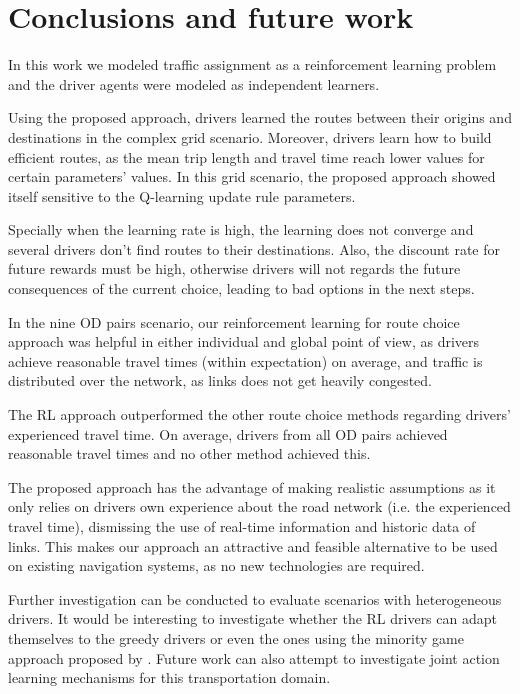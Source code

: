 \documentclass{RITA}
\begin{document}
\section{Conclusions and future work}
\label{sec:conclusions}

In this work we modeled traffic assignment as a reinforcement learning problem and the driver agents were modeled as independent learners.

Using the proposed approach, drivers learned the routes between their origins and destinations in the complex grid scenario. Moreover, drivers learn how to build efficient routes, as the mean trip length and travel time reach lower values for certain parameters' values. In this grid scenario, the proposed approach showed itself sensitive to the Q-learning update rule parameters. 

Specially when the learning rate is high, the learning does not converge and several drivers don't find routes to their destinations. Also, the discount rate for future rewards must be high, otherwise drivers will not regards the future consequences of the current choice, leading to bad options in the next steps.

In the nine OD pairs scenario, our reinforcement learning for route choice approach was helpful in either individual and global point of view, as drivers achieve reasonable travel times (within expectation) on average, and traffic is distributed over the network, as links does not get heavily congested.

The RL approach outperformed the other route choice methods regarding drivers' experienced travel time. On average, drivers from all OD pairs achieved reasonable travel times and no other method achieved this.


The proposed approach has the advantage of making realistic assumptions as it only relies on drivers own experience about the road network (i.e. the experienced travel time), dismissing the use of real-time information and historic data of links. This makes our approach an attractive and feasible alternative to be used on existing navigation systems, as no new technologies are required.

Further investigation can be conducted to evaluate scenarios with heterogeneous drivers. It would be interesting to investigate whether the RL drivers can adapt themselves to the greedy drivers or even the ones using the minority game approach proposed by \cite{Galib&Moser2011}. Future work can also attempt to investigate joint action learning mechanisms for this transportation domain.
\end{document}
